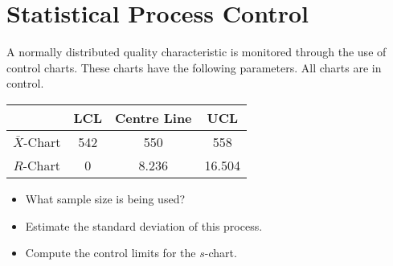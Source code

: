 \documentclass[a4paper,12pt]{article}
\begin{document}
\section{Statistical Process Control}
A normally distributed quality characteristic is monitored through the use of control charts. These charts have the 
following parameters. All charts are in control.
\begin{tabular}{|c|c|c|c|}
\hline  & LCL & Centre Line & UCL \\ 
\hline $\bar{X}$-Chart & 542 & 550 & 558 \\ 
\hline $R$-Chart & 0 & 8.236 & 16.504 \\ 
\hline 
\end{tabular} 
\begin{itemize}
\item What sample size is being used?
\item Estimate the standard deviation of this process.
\item Compute the control limits for the $s$-chart.
\end{itemize}
\end{document}
